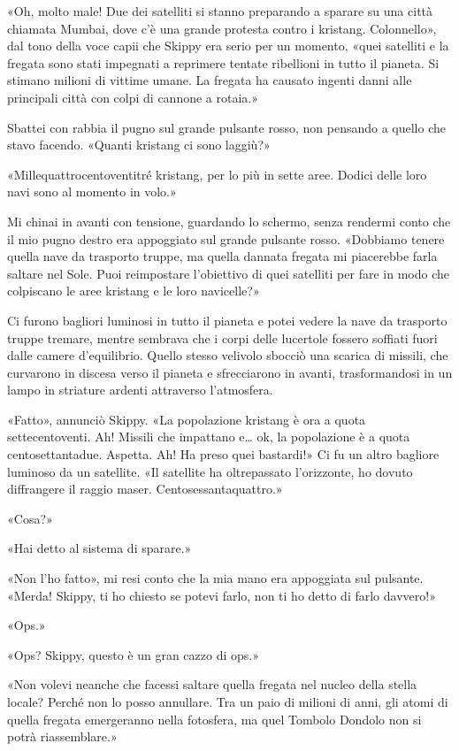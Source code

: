 «Oh, molto male! Due dei satelliti si stanno preparando a sparare su una
città chiamata Mumbai, dove c'è una grande protesta contro i kristang.
Colonnello», dal tono della voce capii che Skippy era serio per un
momento, «quei satelliti e la fregata sono stati impegnati a reprimere
tentate ribellioni in tutto il pianeta. Si stimano milioni di vittime
umane. La fregata ha causato ingenti danni alle principali città con
colpi di cannone a rotaia.»

Sbattei con rabbia il pugno sul grande pulsante rosso, non pensando a
quello che stavo facendo. «Quanti kristang ci sono laggiù?»

«Millequattrocentoventitré kristang, per lo più in sette aree. Dodici
delle loro navi sono al momento in volo.»

Mi chinai in avanti con tensione, guardando lo schermo, senza rendermi
conto che il mio pugno destro era appoggiato sul grande pulsante rosso.
«Dobbiamo tenere quella nave da trasporto truppe, ma quella dannata
fregata mi piacerebbe farla saltare nel Sole. Puoi reimpostare
l'obiettivo di quei satelliti per fare in modo che colpiscano le aree
kristang e le loro navicelle?»

Ci furono bagliori luminosi in tutto il pianeta e potei vedere la nave
da trasporto truppe tremare, mentre sembrava che i corpi delle lucertole
fossero soffiati fuori dalle camere d'equilibrio. Quello stesso velivolo
sbocciò una scarica di missili, che curvarono in discesa verso il
pianeta e sfrecciarono in avanti, trasformandosi in un lampo in
striature ardenti attraverso l'atmosfera.

«Fatto», annunciò Skippy. «La popolazione kristang è ora a quota
settecentoventi. Ah! Missili che impattano e\ldots{} ok, la popolazione
è a quota centosettantadue. Aspetta. Ah! Ha preso quei bastardi!» Ci fu
un altro bagliore luminoso da un satellite. «Il satellite ha
oltrepassato l'orizzonte, ho dovuto diffrangere il raggio maser.
Centosessantaquattro.»

«Cosa?»

«Hai detto al sistema di sparare.»

«Non l'ho fatto», mi resi conto che la mia mano era appoggiata sul
pulsante. «Merda! Skippy, ti ho chiesto se potevi farlo, non ti ho detto
di farlo davvero!»

«Ops.»

«Ops? Skippy, questo è un gran cazzo di ops.»

«Non volevi neanche che facessi saltare quella fregata nel nucleo della
stella locale? Perché non lo posso annullare. Tra un paio di milioni di
anni, gli atomi di quella fregata emergeranno nella fotosfera, ma quel
Tombolo Dondolo non si potrà riassemblare.»

